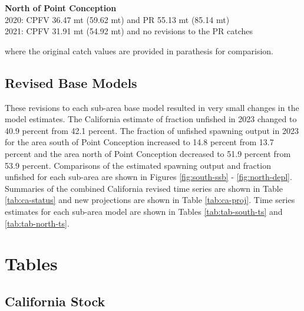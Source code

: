 \documentclass[
  letterpaper,
]{article}
\begin{document}
\textbf{North of Point Conception}\\
2020: CPFV 36.47 mt (59.62 mt) and PR 55.13 mt (85.14 mt)\\
2021: CPFV 31.91 mt (54.92 mt) and no revisions to the PR catches

where the original catch values are provided in parathesis for comparision.

\hypertarget{revised-base-models}{%
\subsection{Revised Base Models}\label{revised-base-models}}

These revisions to each sub-area base model resulted in very small changes in the model estimates. The California estimate of fraction unfished in 2023 changed to 40.9 percent from 42.1 percent. The fraction of unfished spawning output in 2023 for the area south of Point Conception increased to 14.8 percent from 13.7 percent and the area north of Point Conception decreased to 51.9 percent from 53.9 percent. Comparisons of the estimated spawning output and fraction unfished for each sub-area are shown in Figures \ref{fig:south-ssb} - \ref{fig:north-depl}. Summaries of the combined California revised time series are shown in Table \ref{tab:ca-status} and new projections are shown in Table \ref{tab:ca-proj}. Time series estimates for each sub-area model are shown in Tables \ref{tab:tab-south-ts} and \ref{tab:tab-north-ts}.

\pagebreak

\hypertarget{tables}{%
\section{Tables}\label{tables}}

\hypertarget{california-stock}{%
\subsection{California Stock}\label{california-stock}}

\begingroup\fontsize{10}{12}\selectfont
\begingroup\fontsize{10}{12}\selectfont
\end{document}
